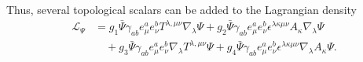 \documentclass{ws-mpla}
\renewcommand{\(}{\left(}
\renewcommand{\)}{\right)}
\renewcommand{\[}{\left[}
\renewcommand{\]}{\right]}
\begin{document}
Thus, several topological scalars can be added to the Lagrangian density
\begin{equation}
  \label{SpinorLagrangian}
  \begin{split}
    \mathcal{L}_\Psi &= g_1 \bar\Psi\gamma_{ab}e^a_{\mu}e^b_{\nu}T^{\lambda,\mu\nu}\nabla_\lambda\Psi
    +g_2 \bar\Psi\gamma_{ab}e^a_{\mu}e^b_{\nu}\epsilon^{\lambda\kappa\mu\nu}A_\kappa\nabla_\lambda\Psi \\
    & \quad +g_3 \bar\Psi\gamma_{ab}e^a_{\mu}e^b_{\nu}\nabla_\lambda T^{\lambda,\mu\nu}\Psi
    +g_4 \bar\Psi\gamma_{ab}e^a_{\mu}e^b_{\nu}\epsilon^{\lambda\kappa\mu\nu}\nabla_\lambda A_\kappa\Psi.
  \end{split}
\end{equation}





\end{document}
